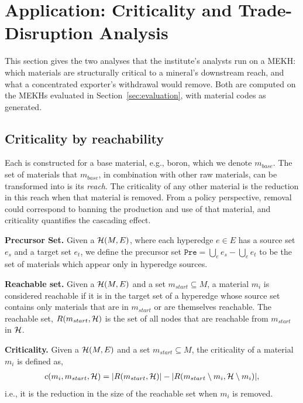 \section{Application: Criticality and Trade-Disruption Analysis}
\label{sec:application}

This section gives the two analyses that the institute's analysts run on a MEKH: which materials are structurally critical to a mineral's downstream reach, and what a concentrated exporter's withdrawal would remove. Both are computed on the MEKHs evaluated in Section~\ref{sec:evaluation}, with material codes as generated.

\subsection{Criticality by reachability}
Each \tool{} is constructed for a base material, e.g., boron, which we denote $m_{base}$. The set of materials that $m_{base}$, in combination with other raw materials, can be transformed into is its \textit{reach}. The criticality of any other material is the reduction in this reach when that material is removed. From a policy perspective, removal could correspond to banning the production and use of that material, and criticality quantifies the cascading effect.

\begin{definition}
\label{def:pre}
\textbf{Precursor Set.}
Given a \tool{} $\mathcal{H}(M, E)$, where each hyperedge $e \in E$ has a source set $e_s$ and a target set $e_t$, we define the precursor set $\mathtt{Pre} = \bigcup_e e_s - \bigcup_e e_t$ to be the set of materials which appear only in hyperedge sources.
\end{definition}

\begin{definition}
\label{def:reach}
\textbf{Reachable set.}
Given a \tool{} $\mathcal{H}(M, E)$ and a set $m_{start} \subseteq M$, a material $m_i$ is considered reachable if it is in the
target set of a hyperedge whose source set contains only materials that are in $m_{start}$ or are themselves reachable. The 
reachable set, $R(m_{start}, \mathcal{H})$ is the set of all nodes that are reachable from $m_{start}$ in $\mathcal{H}$.
\end{definition}

\begin{definition}
\label{def:criticality}
\textbf{Criticality.}
Given a \tool{} $\mathcal{H}(M, E)$ and a set $m_{start} \subseteq M$, the criticality of a material $m_i$ is defined as, 
\begin{align}
\nonumber
c(m_i, m_{start}, \mathcal{H}) = |R(m_{start}, \mathcal{H})| - |R(m_{start}\setminus m_i, \mathcal{H} \setminus m_i)|,
\end{align}
i.e., it is the reduction in the 
size of the reachable set when $m_i$ is removed.
\end{definition}

